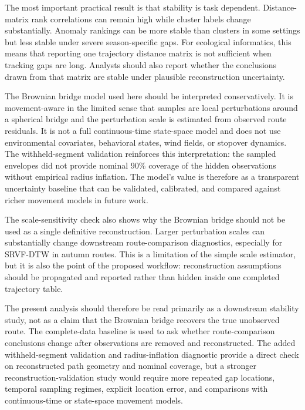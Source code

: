 The most important practical result is that stability is task dependent. Distance-matrix rank correlations can remain high while cluster labels change substantially. Anomaly rankings can be more stable than clusters in some settings but less stable under severe season-specific gaps. For ecological informatics, this means that reporting one trajectory distance matrix is not sufficient when tracking gaps are long. Analysts should also report whether the conclusions drawn from that matrix are stable under plausible reconstruction uncertainty.

The Brownian bridge model used here should be interpreted conservatively. It is movement-aware in the limited sense that samples are local perturbations around a spherical bridge and the perturbation scale is estimated from observed route residuals. It is not a full continuous-time state-space model and does not use environmental covariates, behavioral states, wind fields, or stopover dynamics. The withheld-segment validation reinforces this interpretation: the sampled envelopes did not provide nominal 90\% coverage of the hidden observations without empirical radius inflation. The model's value is therefore as a transparent uncertainty baseline that can be validated, calibrated, and compared against richer movement models in future work.

The scale-sensitivity check also shows why the Brownian bridge should not be used as a single definitive reconstruction. Larger perturbation scales can substantially change downstream route-comparison diagnostics, especially for SRVF-DTW in autumn routes. This is a limitation of the simple scale estimator, but it is also the point of the proposed workflow: reconstruction assumptions should be propagated and reported rather than hidden inside one completed trajectory table.

The present analysis should therefore be read primarily as a downstream stability study, not as a claim that the Brownian bridge recovers the true unobserved route. The complete-data baseline is used to ask whether route-comparison conclusions change after observations are removed and reconstructed. The added withheld-segment validation and radius-inflation diagnostic provide a direct check on reconstructed path geometry and nominal coverage, but a stronger reconstruction-validation study would require more repeated gap locations, temporal sampling regimes, explicit location error, and comparisons with continuous-time or state-space movement models.

